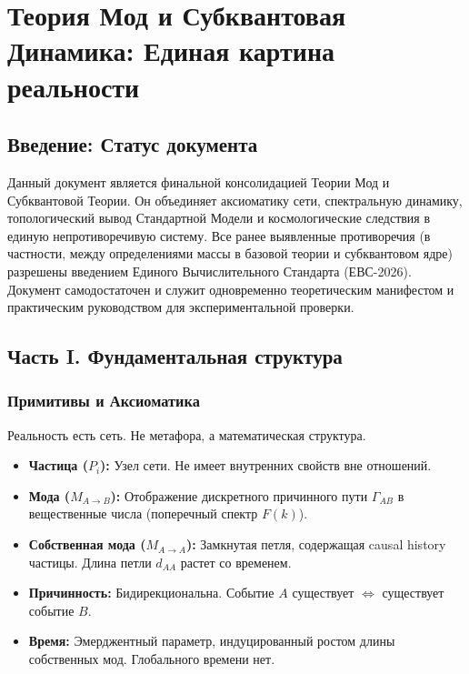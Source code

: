 \documentclass[12pt,a4paper]{article}
\begin{document}
\section{Теория Мод и Субквантовая Динамика: Единая картина реальности}

\subsection*{Введение: Статус документа}
Данный документ является финальной консолидацией Теории Мод и Субквантовой Теории. Он объединяет аксиоматику сети, спектральную динамику, топологический вывод Стандартной Модели и космологические следствия в единую непротиворечивую систему. Все ранее выявленные противоречия (в частности, между определениями массы в базовой теории и субквантовом ядре) разрешены введением Единого Вычислительного Стандарта (ЕВС-2026). Документ самодостаточен и служит одновременно теоретическим манифестом и практическим руководством для экспериментальной проверки.

\subsection{Часть I. Фундаментальная структура}

\subsubsection{Примитивы и Аксиоматика}
Реальность есть сеть. Не метафора, а математическая структура.
\begin{itemize}
    \item \textbf{Частица ($P_i$):} Узел сети. Не имеет внутренних свойств вне отношений.
    \item \textbf{Мода ($M_{A \to B}$):} Отображение дискретного причинного пути $\Gamma_{AB}$ в вещественные числа (поперечный спектр $F(k)$).
    \item \textbf{Собственная мода ($M_{A \to A}$):} Замкнутая петля, содержащая causal history частицы. Длина петли $d_{AA}$ растет со временем.
    \item \textbf{Причинность:} Бидирекциональна. Событие $A$ существует $\iff$ существует событие $B$.
    \item \textbf{Время:} Эмерджентный параметр, индуцированный ростом длины собственных мод. Глобального времени нет.
\end{itemize}
\end{document}
